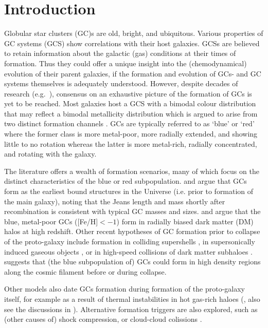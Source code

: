 \documentclass[a4paper,fleqn,usenatbib]{mnras}
\begin{document}
\section{Introduction}
Globular star clusters (GC)s are old, bright, and ubiquitous. Various properties of
GC systems (GCS) show correlations with their host galaxies. GCSs are believed to
retain information about the galactic (gas) conditions at their times of formation.
Thus they could offer a unique insight into the (chemodynamical) evolution of their 
parent galaxies, if the formation and evolution of GCs- and GC systems themselves 
is adequately understood. However, despite decades of research (e.g.~\citealt{
1991ARA&A..29..543H, Harris2001, 2004Natur.427...31W, 2006ARA&A..44..193B, 
2012A&ARv..20...50G, 2014CQGra..31x4006K, 2018RSPSA.47470616F}), consensus on an 
exhaustive picture of the formation of GCs is yet to be reached. Most galaxies host
a GCS with a bimodal colour distribution that may reflect a bimodal metallicity 
distribution which is argued to arise from two distinct formation channels 
\citep{2006ARA&A..44..193B}. GCs are typically referred to as `blue' or `red' \citep[e.g.][]{
1985ApJ...293..424Z,1999AJ....118.1526G,2001AJ....121.2974L} where the former class
is more metal-poor, more radially extended, and showing little to no rotation whereas
the latter is more metal-rich, radially concentrated, and rotating with the galaxy.

The literature offers a wealth of formation scenarios, many of which focus on the
distinct characteristics of the blue or red subpopulation. \citet{1968ApJ...154..891P}
and \citet{1984ApJ...277..470P} argue that GCs form as the earliest bound
structures in the Universe (i.e. prior to formation of the main galaxy), 
noting that the Jeans length and mass shortly after recombination is consistent
with typical GC masses and sizes. \citet{2005MNRAS.364..367D} and \citet{
2009ApJ...706L.192B} argue that the blue, metal-poor GCs ([Fe/H]$ < -1$) form in 
radially biased dark matter (DM) halos at high redshift. Other recent hypotheses 
of GC formation prior to collapse of the proto-galaxy include formation in colliding 
supershells \citep{2017Ap&SS.362..183R}, in supersonically induced gaseous objects
\citep{2019ApJ...878L..23C}, or in high-speed collisions of dark matter subhaloes
\citep{2020ApJ...890...18M}. \citet{2017MNRAS.472.3120B} suggests
that (the blue subpopulation of) GCs could form in high density regions along
the cosmic filament before or during collapse.

Other models also date GCs formation during formation of the proto-galaxy itself,
for example as a result of thermal instabilities in hot gas-rich haloes 
(\citealt{1985ApJ...298...18F}, also see the discussions in \citealt{
1990ApJ...363..488K}). Alternative formation triggers are also explored, such as 
(other causes of) shock compression, or cloud-cloud colissions \citep[e.g.][]{
1980glcl.conf..301G, 1992ApJ...400..265M, 1994ApJ...429..177H, 1995ApJ...442..618V,
1996ASPC...92..241L, 2001ApJ...560..592C}. 
\end{document}
